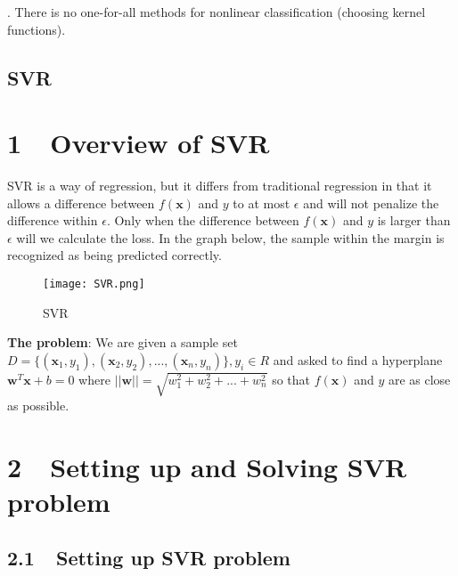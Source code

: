 \documentclass{article}
\begin{document}
. There is no one-for-all methods for nonlinear classification (choosing kernel functions).









\newpage

\begin{center}
\section*{\textbf{{\Huge SVR}}}
\end{center}

\section*{1 $    $ $  $ Overview of SVR}

SVR is a way of regression, but it differs from traditional regression in that it allows a difference between $f(\boldsymbol{x})$ and $y$ to at most $\epsilon$ and will not penalize the difference within $\epsilon$. Only when the difference between $f(\boldsymbol{x})$ and $y$ is larger than $\epsilon$ will we calculate the loss. In the graph below, the sample within the margin is recognized as being predicted correctly.

\begin{figure}[H]
\centering
\texttt{[image: SVR.png]}
\caption{SVR}
\label{fig5}
\end{figure}

\noindent \textbf{The problem}: We are given a sample set $D = \{(\mathbf{x}_1, y_1),(\mathbf{x}_2, y_2),...,(\mathbf{x}_n, y_n)\}, y_i \in R$ and asked to find a hyperplane $ \boldsymbol{w}^T\boldsymbol{x} + b = 0$ where $||\boldsymbol{w}|| = \sqrt{w_1^2 + w_2^2 + ... + w_n^2}$ so that $f(\boldsymbol{x})$ and $y$ are as close as possible.

\section*{2 $    $ $  $ Setting up and Solving SVR problem}

\subsection*{2.1 $    $ $  $ Setting up SVR problem}
\end{document}
